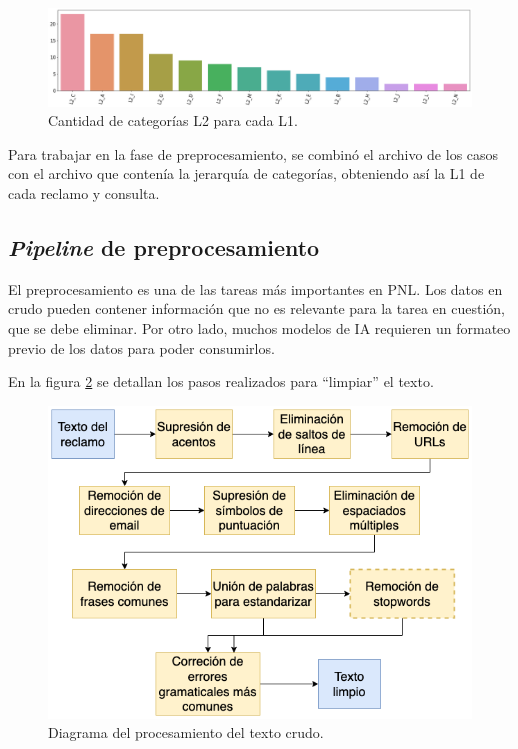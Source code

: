 \begin{figure}[htbp]
	\centering
	\includegraphics[width=1\textwidth]{./Figures/catl2porl1.png}
	\caption{Cantidad de categorías L2 para cada L1.}
	\label{fig:catl2porl1}
\end{figure}

Para trabajar en la fase de preprocesamiento, se combinó el archivo de los casos con el archivo que contenía la jerarquía de categorías, obteniendo así la L1 de cada reclamo y consulta.

\subsection{\textit{Pipeline} de preprocesamiento}

El preprocesamiento es una de las tareas más importantes en PNL. Los datos en crudo pueden contener información que no es relevante para la tarea en cuestión, que se debe eliminar. Por otro lado, muchos modelos de IA requieren un formateo previo de los datos para poder consumirlos.

En la figura \ref{fig:pipeline-texto} se detallan los pasos realizados para ``limpiar'' el texto.

\begin{figure}[htbp]
	\centering
	\includegraphics[width=.7\textwidth]{./Figures/pipeline-texto.png}
	\caption{Diagrama del procesamiento del texto crudo.}
	\label{fig:pipeline-texto}
\end{figure}


